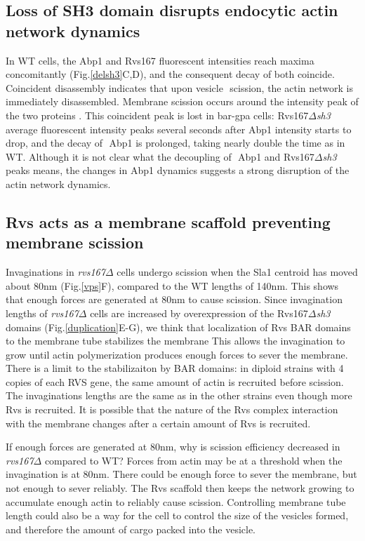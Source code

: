 \documentclass[9pt,lineno]{elife}
\begin{document}
\subsection{Loss of SH3 domain disrupts endocytic actin network dynamics}
In WT cells, the Abp1 and Rvs167 fluorescent intensities reach maxima concomitantly (Fig.\ref{delsh3}C,D), and the consequent decay of both coincide. Coincident disassembly indicates that upon vesicle  scission, the actin network is immediately disassembled. Membrane scission occurs around the intensity peak of the two proteins \citep{Kukulski2012,Picco2015}. This coincident peak is lost in bar-gpa cells: Rvs167\textit{$\Delta$sh3} average fluorescent intensity peaks several seconds after Abp1 intensity starts to drop, and the decay of  Abp1 is prolonged, taking nearly double the time as in WT. Although it is not clear what the decoupling of  Abp1 and Rvs167\textit{$\Delta$sh3} peaks means, the changes in Abp1 dynamics suggests a strong disruption of the actin network dynamics.


\subsection{Rvs acts as a membrane scaffold preventing membrane scission}
Invaginations in \textit{rvs167$\Delta$} cells undergo scission when the Sla1 centroid has moved about 80nm (Fig.\ref{vps}F), compared to the WT lengths of 140nm. This shows that enough forces are generated at 80nm to cause scission. Since invagination lengths of \textit{rvs167$\Delta$} cells are increased by overexpression of the Rvs167\textit{$\Delta$sh3} domains (Fig.\ref{duplication}E-G), we think that localization of Rvs BAR domains to the membrane tube stabilizes the  membrane \citep{Boucrot2012,Dmitrieff2015} This allows the invagination to grow until actin polymerization produces enough forces to sever the membrane. There is a limit to the stabilizaiton by BAR domains: in diploid strains with 4 copies of each RVS gene, the same amount of actin is recruited before scission. The invaginations lengths are the same as in the other strains even though more Rvs is recruited. It is possible that the nature of the Rvs complex interaction with the membrane changes after a certain amount of Rvs is recruited. 

If enough forces are generated at 80nm, why is scission efficiency decreased in \textit{rvs167$\Delta$}  compared to WT? Forces from actin may be at a threshold when the invagination is at 80nm. There could be enough force to sever the membrane, but not enough to sever reliably. The Rvs scaffold then keeps the network growing to accumulate enough actin to reliably cause scission. Controlling membrane  tube length could also be a way for the cell to control the size of the vesicles formed, and therefore the amount of cargo packed into the vesicle. 
\end{document}
